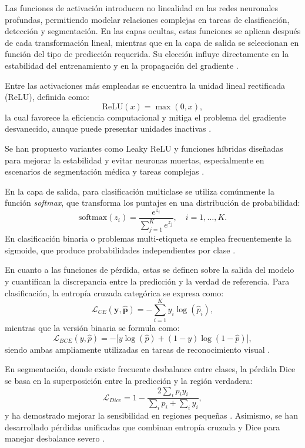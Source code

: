 Las funciones de activación introducen no linealidad en las redes neuronales profundas, permitiendo modelar relaciones complejas en tareas de clasificación, detección y segmentación. En las capas ocultas, estas funciones se aplican después de cada transformación lineal, mientras que en la capa de salida se seleccionan en función del tipo de predicción requerida. Su elección influye directamente en la estabilidad del entrenamiento y en la propagación del gradiente \parencite{zhu2020activation,too2020activation,khalid2020activation}.

Entre las activaciones más empleadas se encuentra la unidad lineal rectificada (ReLU), definida como:
\[
\mathrm{ReLU}(x)=\max(0,x),
\]
la cual favorece la eficiencia computacional y mitiga el problema del gradiente desvanecido, aunque puede presentar unidades inactivas \parencite{too2020activation,khalid2020activation}. 

Se han propuesto variantes como Leaky ReLU y funciones híbridas diseñadas para mejorar la estabilidad y evitar neuronas muertas, especialmente en escenarios de segmentación médica y tareas complejas \parencite{biswas2024asau,waqas2025medrelu,kilicarslan2023hardrelu}. 

En la capa de salida, para clasificación multiclase se utiliza comúnmente la función \textit{softmax}, que transforma los puntajes en una distribución de probabilidad:
$$
\mathrm{softmax}(z_i)=\frac{e^{z_i}}{\sum_{j=1}^{K} e^{z_j}}, \quad i=1,\dots,K.
$$
En clasificación binaria o problemas multi-etiqueta se emplea frecuentemente la sigmoide, que produce probabilidades independientes por clase \parencite{tian2022lossreview}.

En cuanto a las funciones de pérdida, estas se definen sobre la salida del modelo y cuantifican la discrepancia entre la predicción y la verdad de referencia. Para clasificación, la entropía cruzada categórica se expresa como:
\[
\mathcal{L}_{CE}(\mathbf{y},\hat{\mathbf{p}})=-\sum_{i=1}^{K} y_i \log(\hat{p}_i),
\]
mientras que la versión binaria se formula como:
\[
\mathcal{L}_{BCE}(y,\hat{p})=-\big[y\log(\hat{p})+(1-y)\log(1-\hat{p})\big],
\]
siendo ambas ampliamente utilizadas en tareas de reconocimiento visual \parencite{tian2022lossreview,ito2023loss}.

En segmentación, donde existe frecuente desbalance entre clases, la pérdida Dice se basa en la superposición entre la predicción y la región verdadera:
\[
\mathcal{L}_{Dice}=1-\frac{2\sum_i p_i y_i}{\sum_i p_i+\sum_i y_i},
\]
y ha demostrado mejorar la sensibilidad en regiones pequeñas \parencite{zhang2021dice,yeung2022unified}. Asimismo, se han desarrollado pérdidas unificadas que combinan entropía cruzada y Dice para manejar desbalance severo \parencite{yeung2022unified}.

